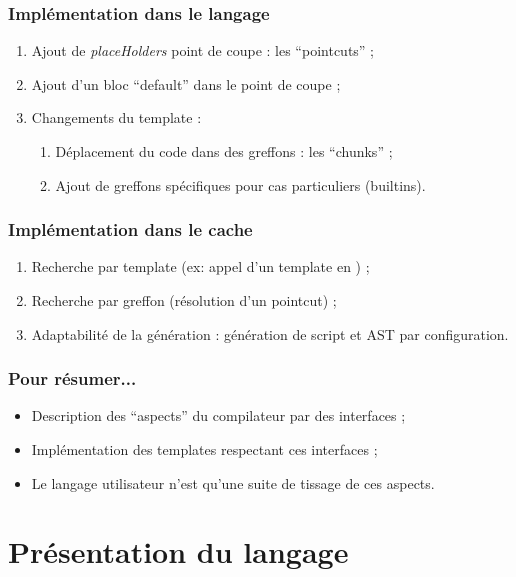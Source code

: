 \documentclass[]{beamer}
\begin{document}
\begin{frame}
\frametitle{Implémentation dans le langage}
\begin{enumerate}[<+->]
    \item Ajout de \emph{placeHolders} point de coupe : les ``pointcuts'' ;
    \item Ajout d'un bloc ``default'' dans le point de coupe ;
    \item Changements du template :
        \begin{enumerate}
            \item Déplacement du code dans des greffons : les ``chunks'' ;
            \item Ajout de greffons spécifiques pour cas particuliers
                (builtins).
        \end{enumerate}
\end{enumerate}
\end{frame}

\begin{frame}
\frametitle{Implémentation dans le cache}
\begin{enumerate}[<+->]
    \item Recherche par template (ex: appel d'un template en \rtx) ;
    \item Recherche par greffon (résolution d'un pointcut) ;
    \item Adaptabilité de la génération :
        génération de script et AST par configuration.
\end{enumerate}
\end{frame}

\begin{frame}
\frametitle{Pour résumer...}
\begin{itemize}
    \item Description des ``aspects'' du compilateur par des interfaces ;
    \item Implémentation des templates respectant ces interfaces ;
    \item Le langage utilisateur n'est qu'une suite de tissage de ces aspects.
\end{itemize}
\end{frame}

\section{Présentation du langage}
\end{document}
